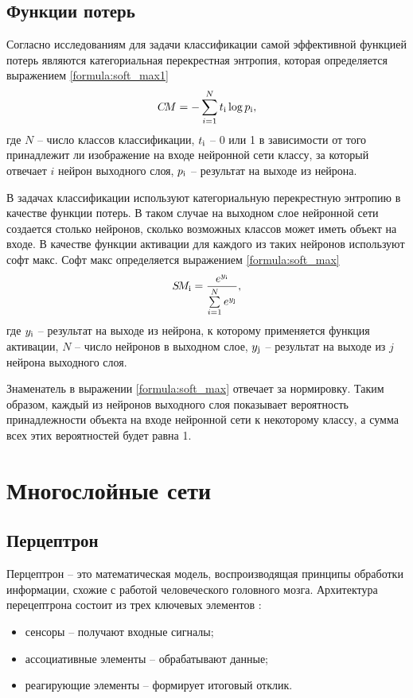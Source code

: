 \subsection{Функции потерь}
Согласно исследованиям \cite{loss_function} для задачи классификации самой эффективной функцией потерь являются категориальная перекрестная энтропия, которая определяется выражением \ref{formula:soft_max1}
\begin{equation}\label{formula:soft_max1}
C\!M = - \sum\limits_{i = 1}^{N}t_{\rm{i}}\log{p_{\rm{i}}},
\end{equation}
где $N$ -- число классов классификации, $t_{\rm{i}}$ -- 0 или 1 в зависимости от того принадлежит ли изображение на входе нейронной сети классу, за который отвечает $i$ нейрон выходного слоя, $p_{\rm{i}}$ -- результат на выходе из нейрона.

В задачах классификации используют категориальную перекрестную энтропию в качестве функции потерь. 
В таком случае на выходном слое нейронной сети создается столько нейронов, сколько возможных классов может иметь объект на входе.
В качестве функции активации для каждого из таких нейронов используют софт макс. 
Софт макс определяется выражением \ref{formula:soft_max}
\begin{equation}\label{formula:soft_max}
S\!M_{\rm{i}} = \frac{e^{y_{\rm{i}}}}{\sum\limits_{i = 1}^{N}e^{y_{\rm{j}}}},
\end{equation}
где $y_{\rm{i}}$ -- результат на выходе из нейрона, к которому применяется функция активации, $N$ -- число нейронов в выходном слое, $y_{\rm{j}}$ -- результат на выходе из $j$ нейрона выходного слоя.

Знаменатель в выражении \ref{formula:soft_max} отвечает за нормировку. 
Таким образом, каждый из нейронов выходного слоя показывает вероятность принадлежности объекта на входе нейронной сети к некоторому классу, а сумма всех этих вероятностей будет равна 1.

\section{Многослойные сети}
\subsection{Перцептрон}
Перцептрон -- это математическая модель, воспроизводящая принципы обработки информации, схожие с работой человеческого головного мозга. Архитектура перецептрона состоит из трех ключевых элементов \cite{perceptron}:
\begin{itemize}
	\item сенсоры -- получают входные сигналы;
	\item ассоциативные элементы -- обрабатывают данные;
	\item реагирующие элементы -- формирует итоговый отклик.
\end{itemize}

